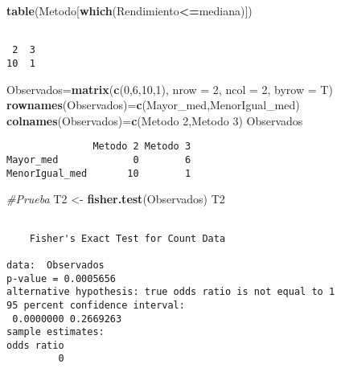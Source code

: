 \documentclass[
  a4paper,
  oneside,
  openany]{book}
\newenvironment{Shaded}{\begin{snugshade}}{\end{snugshade}}
\newcommand{\AttributeTok}[1]{\textcolor[rgb]{0.13,0.29,0.53}{#1}}
\newcommand{\CommentTok}[1]{\textcolor[rgb]{0.56,0.35,0.01}{\textit{#1}}}
\newcommand{\DecValTok}[1]{\textcolor[rgb]{0.00,0.00,0.81}{#1}}
\newcommand{\FunctionTok}[1]{\textcolor[rgb]{0.13,0.29,0.53}{\textbf{#1}}}
\newcommand{\NormalTok}[1]{#1}
\newcommand{\OtherTok}[1]{\textcolor[rgb]{0.56,0.35,0.01}{#1}}
\newcommand{\SpecialCharTok}[1]{\textcolor[rgb]{0.81,0.36,0.00}{\textbf{#1}}}
\newcommand{\StringTok}[1]{\textcolor[rgb]{0.31,0.60,0.02}{#1}}
\begin{document}
\begin{Shaded}
\begin{Highlighting}[]
\FunctionTok{table}\NormalTok{(Metodo[}\FunctionTok{which}\NormalTok{(Rendimiento}\SpecialCharTok{\textless{}=}\NormalTok{mediana)])}
\end{Highlighting}
\end{Shaded}

\begin{verbatim}

 2  3 
10  1 
\end{verbatim}

\begin{Shaded}
\begin{Highlighting}[]
\NormalTok{Observados}\OtherTok{=}\FunctionTok{matrix}\NormalTok{(}\FunctionTok{c}\NormalTok{(}\DecValTok{0}\NormalTok{,}\DecValTok{6}\NormalTok{,}\DecValTok{10}\NormalTok{,}\DecValTok{1}\NormalTok{), }\AttributeTok{nrow =} \DecValTok{2}\NormalTok{, }\AttributeTok{ncol =} \DecValTok{2}\NormalTok{, }\AttributeTok{byrow =}\NormalTok{ T)}
\FunctionTok{rownames}\NormalTok{(Observados)}\OtherTok{=}\FunctionTok{c}\NormalTok{(}\StringTok{\textquotesingle{}Mayor\_med\textquotesingle{}}\NormalTok{,}\StringTok{\textquotesingle{}MenorIgual\_med\textquotesingle{}}\NormalTok{)}
\FunctionTok{colnames}\NormalTok{(Observados)}\OtherTok{=}\FunctionTok{c}\NormalTok{(}\StringTok{\textquotesingle{}Metodo 2\textquotesingle{}}\NormalTok{,}\StringTok{\textquotesingle{}Metodo 3\textquotesingle{}}\NormalTok{)}
\NormalTok{Observados}
\end{Highlighting}
\end{Shaded}

\begin{verbatim}
               Metodo 2 Metodo 3
Mayor_med             0        6
MenorIgual_med       10        1
\end{verbatim}

\begin{Shaded}
\begin{Highlighting}[]
\CommentTok{\#Prueba}
\NormalTok{T2 }\OtherTok{\textless{}{-}} \FunctionTok{fisher.test}\NormalTok{(Observados)}
\NormalTok{T2}
\end{Highlighting}
\end{Shaded}

\begin{verbatim}

    Fisher's Exact Test for Count Data

data:  Observados
p-value = 0.0005656
alternative hypothesis: true odds ratio is not equal to 1
95 percent confidence interval:
 0.0000000 0.2669263
sample estimates:
odds ratio 
         0 
\end{verbatim}
\end{document}
